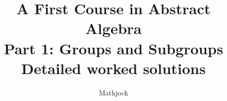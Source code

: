 
\title{\textbf{A First Course in Abstract Algebra}\\[0.3em]Part 1: Groups and Subgroups\\[0.3em]\large Detailed worked solutions}
\author{Mathjock}
\date{}

\maketitle
\bookinfo
\tableofcontents
\clearpage
\renewcommand{\thesection}{1}
\renewcommand{\theHsection}{fraleigh.1}

\clearpage
\renewcommand{\thesection}{2}
\renewcommand{\theHsection}{fraleigh.2}

\clearpage
\renewcommand{\thesection}{3}
\renewcommand{\theHsection}{fraleigh.3}

\clearpage
\renewcommand{\thesection}{4}
\renewcommand{\theHsection}{fraleigh.4}

\clearpage
\renewcommand{\thesection}{5}
\renewcommand{\theHsection}{fraleigh.5}

\clearpage
\renewcommand{\thesection}{6}
\renewcommand{\theHsection}{fraleigh.6}

\clearpage
\renewcommand{\thesection}{7}
\renewcommand{\theHsection}{fraleigh.7}


